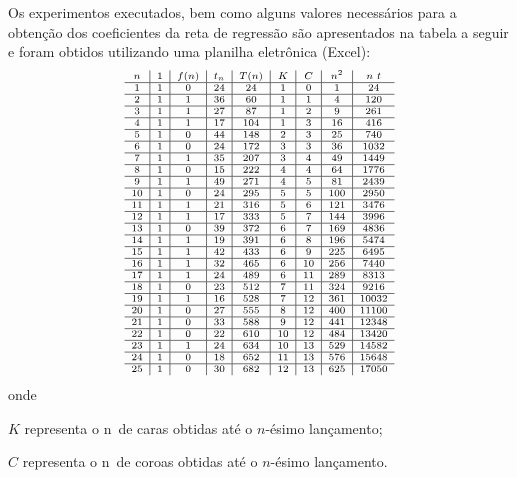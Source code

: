 \begin{exercise}
\begin{description}
{Os experimentos executados, bem como alguns valores necessários para a obtenção dos coeficientes da reta de regressão são apresentados na tabela a seguir e foram obtidos utilizando uma planilha eletrônica (Excel):
\[\scriptsize
\begin{array}{c|c|c|c|c|c|c|c|c}
n & 1 & f(n) & t_n & T(n) & K & C & n^2 & n\ t \\ \hline
1 & 1 & 0 & 24 & 24 & 1 & 0 & 1 & 24 \\ \hline
2 & 1 & 1 & 36 & 60 & 1 & 1 & 4 & 120 \\ \hline
3 & 1 & 1 & 27 & 87 & 1 & 2 & 9 & 261 \\ \hline
4 & 1 & 1 & 17 & 104 & 1 & 3 & 16 & 416 \\ \hline
5 & 1 & 0 & 44 & 148 & 2 & 3 & 25 & 740 \\ \hline
6 & 1 & 0 & 24 & 172 & 3 & 3 & 36 & 1032 \\ \hline
7 & 1 & 1 & 35 & 207 & 3 & 4 & 49 & 1449 \\ \hline
8 & 1 & 0 & 15 & 222 & 4 & 4 & 64 & 1776 \\ \hline
9 & 1 & 1 & 49 & 271 & 4 & 5 & 81 & 2439 \\ \hline
10 & 1 & 0 & 24 & 295 & 5 & 5 & 100 & 2950 \\ \hline
11 & 1 & 1 & 21 & 316 & 5 & 6 & 121 & 3476 \\ \hline
12 & 1 & 1 & 17 & 333 & 5 & 7 & 144 & 3996 \\ \hline
13 & 1 & 0 & 39 & 372 & 6 & 7 & 169 & 4836 \\ \hline
14 & 1 & 1 & 19 & 391 & 6 & 8 & 196 & 5474 \\ \hline
15 & 1 & 1 & 42 & 433 & 6 & 9 & 225 & 6495 \\ \hline
16 & 1 & 1 & 32 & 465 & 6 & 10 & 256 & 7440 \\ \hline
17 & 1 & 1 & 24 & 489 & 6 & 11 & 289 & 8313 \\ \hline
18 & 1 & 0 & 23 & 512 & 7 & 11 & 324 & 9216 \\ \hline
19 & 1 & 1 & 16 & 528 & 7 & 12 & 361 & 10032 \\ \hline
20 & 1 & 0 & 27 & 555 & 8 & 12 & 400 & 11100 \\ \hline
21 & 1 & 0 & 33 & 588 & 9 & 12 & 441 & 12348 \\ \hline
22 & 1 & 0 & 22 & 610 & 10 & 12 & 484 & 13420 \\ \hline
23 & 1 & 1 & 24 & 634 & 10 & 13 & 529 & 14582 \\ \hline
24 & 1 & 0 & 18 & 652 & 11 & 13 & 576 & 15648 \\ \hline
25 & 1 & 0 & 30 & 682 & 12 & 13 & 625 & 17050
\end{array}
\]
onde
\begin{description}
\item \(K\) representa o n\textordmasculine\ de caras obtidas até o \(n\)-ésimo lançamento;
\item \(C\) representa o n\textordmasculine\ de coroas obtidas até o \(n\)-ésimo lançamento.
\end{description}

}
\end{description}
\end{exercise}

